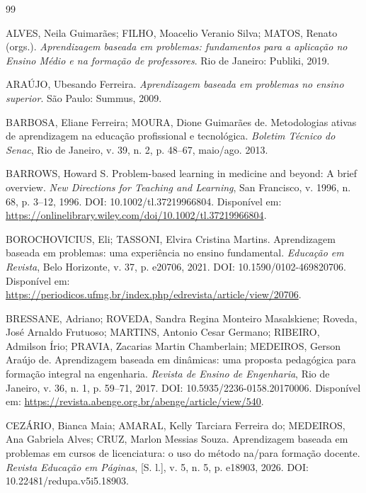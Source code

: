 \begin{thebibliography}{99}


ALVES, Neila Guimarães; FILHO, Moacelio Veranio Silva; MATOS, Renato (orgs.). \textit{Aprendizagem baseada em problemas: fundamentos para a aplicação no Ensino Médio e na formação de professores}. Rio de Janeiro: Publiki, 2019.

ARAÚJO, Ubesando Ferreira. \textit{Aprendizagem baseada em problemas no ensino superior}. São Paulo: Summus, 2009.

BARBOSA, Eliane Ferreira; MOURA, Dione Guimarães de. Metodologias ativas de aprendizagem na educação profissional e tecnológica. \textit{Boletim Técnico do Senac}, Rio de Janeiro, v. 39, n. 2, p. 48--67, maio/ago. 2013.

BARROWS, Howard S. Problem-based learning in medicine and beyond: A brief overview. \textit{New Directions for Teaching and Learning}, San Francisco, v. 1996, n. 68, p. 3--12, 1996. DOI: 10.1002/tl.37219966804. Disponível em: \url{https://onlinelibrary.wiley.com/doi/10.1002/tl.37219966804}.

BOROCHOVICIUS, Eli; TASSONI, Elvira Cristina Martins. Aprendizagem baseada em problemas: uma experiência no ensino fundamental. \textit{Educação em Revista}, Belo Horizonte, v. 37, p. e20706, 2021. DOI: 10.1590/0102-469820706. Disponível em: \url{https://periodicos.ufmg.br/index.php/edrevista/article/view/20706}.

BRESSANE, Adriano; ROVEDA, Sandra Regina Monteiro Masalskiene; Roveda, José Arnaldo Frutuoso; MARTINS, Antonio Cesar Germano; RIBEIRO, Admilson Írio; PRAVIA, Zacarias Martin Chamberlain; MEDEIROS, Gerson Araújo de. Aprendizagem baseada em dinâmicas: uma proposta pedagógica para formação integral na engenharia. \textit{Revista de Ensino de Engenharia}, Rio de Janeiro, v. 36, n. 1, p. 59--71, 2017. DOI: 10.5935/2236-0158.20170006. Disponível em: \url{https://revista.abenge.org.br/abenge/article/view/540}.

CEZÁRIO, Bianca Maia; AMARAL, Kelly Tarciara Ferreira do; MEDEIROS, Ana Gabriela Alves; CRUZ, Marlon Messias Souza. Aprendizagem baseada em problemas em cursos de licenciatura: o uso do método na/para formação docente. \textit{Revista Educação em Páginas}, [S. l.], v. 5, n. 5, p. e18903, 2026. DOI: 10.22481/redupa.v5i5.18903.


\end{thebibliography}
